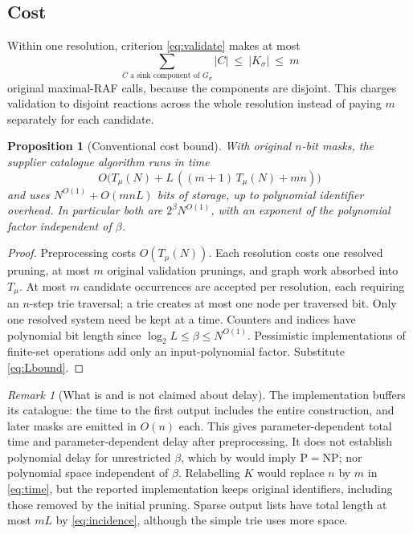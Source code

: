 \documentclass[11pt,a4paper]{article}
\theoremstyle{plain}
\newtheorem{proposition}[theorem]{Proposition}
\theoremstyle{definition}
\theoremstyle{remark}
\newtheorem{remark}[theorem]{Remark}
\begin{document}
\subsection{Cost}\label{sec:cost}

Within one resolution, criterion \eqref{eq:validate} makes at most
\[
 \sum_{C\text{ a sink component of }G_\sigma}|C|\ \le\ |K_\sigma|\ \le\ m
\]
original maximal-RAF calls, because the components are disjoint. This charges validation to disjoint reactions across the whole resolution instead of paying $m$ separately for each candidate.

\begin{proposition}[Conventional cost bound]\label{prop:cost}
With original $n$-bit masks, the supplier catalogue algorithm runs in time
\begin{equation}\label{eq:time}
 O\bigl(T_\mu(N)+L\,((m+1)\,T_\mu(N)+mn)\bigr)
\end{equation}
and uses $N^{O(1)}+O(mnL)$ bits of storage, up to polynomial identifier overhead. In particular both are $2^\beta N^{O(1)}$, with an exponent of the polynomial factor independent of $\beta$.
\end{proposition}
\begin{proof}
Preprocessing costs $O(T_\mu(N))$. Each resolution costs one resolved pruning, at most $m$ original validation prunings, and graph work absorbed into $T_\mu$. At most $m$ candidate occurrences are accepted per resolution, each requiring an $n$-step trie traversal; a trie creates at most one node per traversed bit. Only one resolved system need be kept at a time. Counters and indices have polynomial bit length since $\log_2L\le\beta\le N^{O(1)}$. Pessimistic implementations of finite-set operations add only an input-polynomial factor. Substitute \eqref{eq:Lbound}.
\end{proof}

\begin{remark}[What is and is not claimed about delay]\label{rem:delay}
The implementation buffers its catalogue: the time to the first output includes the entire construction, and later masks are emitted in $O(n)$ each. This gives parameter-dependent total time and parameter-dependent delay after preprocessing. It does not establish polynomial delay for unrestricted $\beta$, which by \cite{classification2026} would imply $\mathrm P=\mathrm{NP}$; nor polynomial space independent of $\beta$. Relabelling $K$ would replace $n$ by $m$ in \eqref{eq:time}, but the reported implementation keeps original identifiers, including those removed by the initial pruning. Sparse output lists have total length at most $mL$ by \eqref{eq:incidence}, although the simple trie uses more space.
\end{remark}
\end{document}
